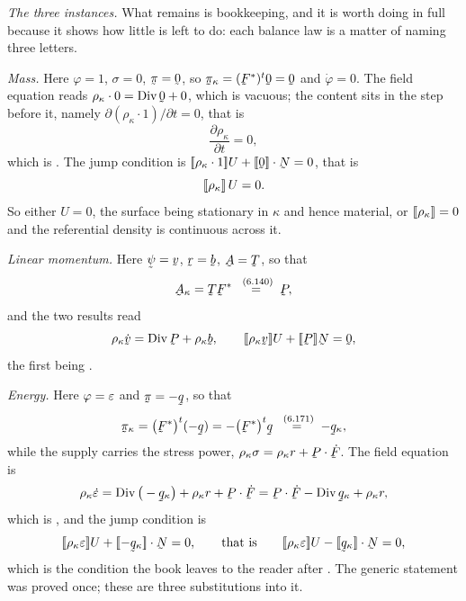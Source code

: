 \begin{solution}
\medskip
\noindent\emph{The three instances.}
What remains is bookkeeping, and it is worth doing in full because it
shows how little is left to do: each balance law is a matter of naming
three letters.

\emph{Mass.} Here $\varphi=1$, $\sigma=0$, $\vek\pi=\bze$, so
$\vek\pi_{\kappa}=(\bF^{*})^{t}\bze=\bze$ and $\dot\varphi=0$. The
field equation reads $\rho_{\kappa}\cdot0=\Dvg\bze+0$, which is
vacuous; the content sits in the step before it, namely
$\partial(\rho_{\kappa}\cdot1)/\partial t=0$, that is
\[
   \frac{\partial\rho_{\kappa}}{\partial t}=0 ,
\]
which is . The jump condition is
$\jump{\rho_{\kappa}\cdot1}U+\ip{\jump{\bze}}\bN=0$, that is
\[
   [\![\rho_{\kappa}]\!]\,U=0 .
\]
So either $U=0$, the surface being stationary in $\kappa$ and hence
material, or $[\![\rho_{\kappa}]\!]=0$ and the referential density is
continuous across it.

\emph{Linear momentum.} Here $\vek\psi=\bv$, $\br=\bb$, $\bA=\bT$, so
that
\[
   \bA_{\kappa}=\bT\bF^{*}\overset{\eqr{6.140}}{=}\bP ,
\]
and the two results read
\[
   \rho_{\kappa}\dot\bv=\Dvg\bP+\rho_{\kappa}\bb ,
   \qquad
   \jump{\rho_{\kappa}\bv}U+\jump\bP\bN=\bze ,
\]
the first being .

\emph{Energy.} Here $\varphi=\varepsilon$ and $\vek\pi=-\bq$, so that
\[
   \vek\pi_{\kappa}=\big(\bF^{*}\big)^{t}(-\bq)
   =-\big(\bF^{*}\big)^{t}\bq
   \overset{\eqr{6.171}}{=}-\bq_{\kappa} ,
\]
while the supply carries the stress power,
$\rho_{\kappa}\sigma=\rho_{\kappa}r+\bP\cdot\dot\bF$. The field
equation is
\[
   \rho_{\kappa}\dot\eps=\Dvg\big(-\bq_{\kappa}\big)
   +\rho_{\kappa}r+\bP\cdot\dot\bF
   =\bP\cdot\dot\bF-\Dvg\bq_{\kappa}+\rho_{\kappa}r ,
\]
which is , and the jump condition is
\[
   \jump{\rho_{\kappa}\eps}U+\ip{\jump{-\bq_{\kappa}}}\bN=0 ,
   \qquad\text{that is}\qquad
   \jump{\rho_{\kappa}\eps}U-\ip{\jump{\bq_{\kappa}}}\bN=0 ,
\]
which is the condition the book leaves to the reader after .
The generic statement was proved once; these are three substitutions
into it.


\end{solution}
